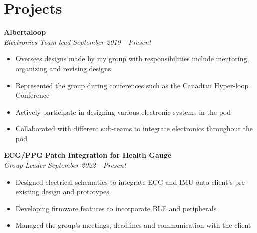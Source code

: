 \documentclass[a4paper,20pt]{article}
\begin{document}
\vspace{-8pt}
\section{Projects}
    \vspace{-1pt}
        \textbf{Albertaloop} \hspace{1em}
        \vspace{2pt}
        \textit{}\\
        \textit{Electronics Team lead} \hspace{10.85cm}
        \textit{September 2019 - Present}
        \vspace{-5pt} 
        \hspace{-10pt}
    \begin{itemize}
        \item Oversees designs made by my group with responsibilities include mentoring, organizing and revising designs \vspace{-5pt}
        \item Represented the group during conferences such as the Canadian Hyper-loop Conference  \vspace{-5pt}
        \item Actively participate in designing various electronic systems in the pod \vspace{-5pt}
        \item Collaborated with different sub-teams to integrate electronics throughout the pod
    \end{itemize}
    \vspace{-1pt}
        \textbf{ECG/PPG Patch Integration for Health Gauge} \\
        \textit{Group Leader} \hspace{12cm}
        \textit{September 2022 - Present}
        \vspace{-5pt}
        \hspace{1em}
    \begin{itemize}
        \item Designed electrical schematics to integrate ECG and IMU onto client's pre-existing design and prototypes \vspace{-5pt}
        \item Developing firmware features to incorporate BLE and peripherals\vspace{-5pt}
        \item Managed the group's meetings, deadlines and communication with the client
    \end{itemize}
\end{document}
